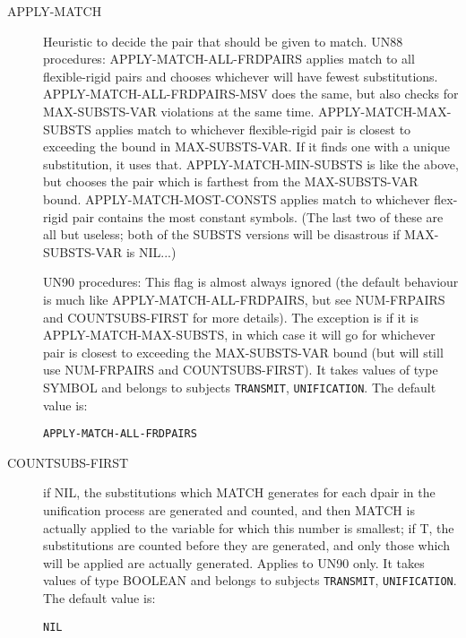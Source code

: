 \begin{description} 
\item[APPLY-MATCH]  
Heuristic to decide the pair that should be given to match.
UN88 procedures:
APPLY-MATCH-ALL-FRDPAIRS applies match to all flexible-rigid pairs 
   and chooses whichever will have fewest substitutions.
APPLY-MATCH-ALL-FRDPAIRS-MSV does the same, but also checks for
   MAX-SUBSTS-VAR violations at the same time.
APPLY-MATCH-MAX-SUBSTS applies match to whichever flexible-rigid
   pair is closest to exceeding the bound in MAX-SUBSTS-VAR.
   If it finds one with a unique substitution, it uses that.
APPLY-MATCH-MIN-SUBSTS is like the above, but chooses the pair
   which is farthest from the MAX-SUBSTS-VAR bound.
APPLY-MATCH-MOST-CONSTS applies match to whichever flex-rigid
   pair contains the most constant symbols.
(The last two of these are all but useless; both of the SUBSTS
versions will be disastrous if MAX-SUBSTS-VAR is NIL...)

UN90 procedures:
This flag is almost always ignored (the default behaviour is
much like APPLY-MATCH-ALL-FRDPAIRS, but see NUM-FRPAIRS and
COUNTSUBS-FIRST for more details). The exception is if it is
APPLY-MATCH-MAX-SUBSTS, in which case it will go for whichever
pair is closest to exceeding the MAX-SUBSTS-VAR bound (but will
still use NUM-FRPAIRS and COUNTSUBS-FIRST).
It takes values of type SYMBOL and belongs to subjects \texttt{TRANSMIT}, \texttt{UNIFICATION}.  The default value is: \begin{lstlisting}
APPLY-MATCH-ALL-FRDPAIRS
\end{lstlisting}

\item[COUNTSUBS-FIRST]  
if NIL, the substitutions which MATCH generates for each dpair in the
unification process are generated and counted, and then MATCH is
actually applied to the variable for which this number is smallest; if
T, the substitutions are counted before they are generated, and only
those which will be applied are actually generated.
Applies to UN90 only.
It takes values of type BOOLEAN and belongs to subjects \texttt{TRANSMIT}, \texttt{UNIFICATION}.  The default value is: \begin{lstlisting}
NIL
\end{lstlisting}


\end{description}
